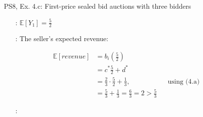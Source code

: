 \begin{frame}{PS8, Ex. 4.c: First-price sealed bid auctions with three bidders}
\begin{multicols}{2}
\begin{itemize}
        \item[\nth{1}:] $\mathbb{E}[Y_1]=\frac{5}{2}$
        \item[\nth{2}:] The seller's expected revenue:
      \end{itemize} \vspace{-12pt}
      \begin{align*}
        \mathbb{E}[revenue]&=b_i\left(\frac{5}{2}\right)\\
                           &= c^*\frac{5}{2}+d^*\\
                           &= \frac{2}{3}\cdot\frac{5}{2}+\frac{1}{3},&&\text{using (4.a)}\\
                           &= \frac{5}{3}+\frac{1}{3}=\frac{6}{3}=2>\frac{5}{3}
      \end{align*}\vspace{-22pt}
      \begin{itemize}
        \item[\nth{3}:] 
      \end{itemize}
      \vfill\null
    \end{multicols}
    \vfill\null
\end{frame}
